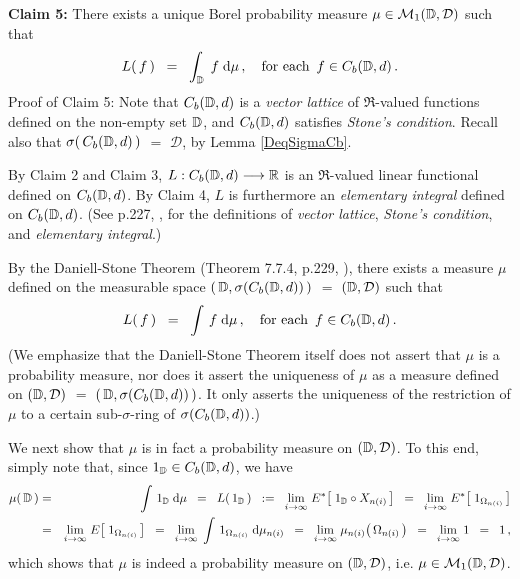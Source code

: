 \vskip 0.8cm
\noindent
\textbf{Claim 5:}\;\;
There exists a unique Borel probability measure $\mu \in \mathcal{M}_{1}(\mathbb{D},\mathcal{D})$ such that
\begin{equation*}
L(\,f\,)
\;\; = \;\;
	\int_{\mathbb{D}}\; f \;\textnormal{d}\mu\,,
\quad
\textnormal{for each \,$f \in C_{b}(\mathbb{D},d)$}\,.
\end{equation*}
\vskip 0.2cm
\noindent
Proof of Claim 5:\;\;
Note that $C_{b}(\mathbb{D},d)$ is a \textit{vector lattice} of $\Re$-valued functions defined on the non-empty set $\mathbb{D}$, and
$C_{b}(\mathbb{D},d)$ satisfies \textit{Stone's condition}.
Recall also that $\sigma\!\left(\,C_{b}(\mathbb{D},d)\,\right)$ $=$ $\mathcal{D}$, by Lemma \ref{DeqSigmaCb}.

\vskip 0.3cm
\noindent
By Claim 2 and Claim 3, $L : C_{b}(\mathbb{D},d) \longrightarrow \mathbb{R}$ is an $\Re$-valued linear functional
defined on $C_{b}(\mathbb{D},d)$.
By Claim 4, $L$ is furthermore an \textit{elementary integral} defined on $C_{b}(\mathbb{D},d)$.
(See p.227, \cite{Cohn2013}, for the definitions of \textit{vector lattice}, \textit{Stone's condition}, and \textit{elementary integral}.)

\vskip 0.3cm
\noindent
By the Daniell-Stone Theorem (Theorem 7.7.4, p.229, \cite{Cohn2013}),
there exists a measure $\mu$ defined on the measurable space
$(\,\mathbb{D},\sigma\!\left(C_{b}(\mathbb{D},d)\right)\,)$ $=$ $(\mathbb{D},\mathcal{D})$ such that
\begin{equation*}
L(\,f\,)
\;\; = \;\;
	\int\, f \;\textnormal{d}\mu\,,
\quad
\textnormal{for each \,$f \in C_{b}(\mathbb{D},d)$}\,.
\end{equation*}
(We emphasize that the Daniell-Stone Theorem itself does not assert that $\mu$ is a probability measure, 
nor does it assert the uniqueness of $\mu$ as a measure defined on
$(\mathbb{D},\mathcal{D})$ $=$ $(\,\mathbb{D},\sigma\!\left(C_{b}(\mathbb{D},d)\right)\,)$.
It only asserts the uniqueness of the restriction of $\mu$ to a certain sub-$\sigma$-ring of
$\sigma\!\left(C_{b}(\mathbb{D},d)\right)$.)

\vskip 0.3cm
\noindent
We next show that $\mu$ is in fact a probability measure on $(\mathbb{D},\mathcal{D})$.
To this end, simply note that, since $1_{\mathbb{D}} \in C_{b}(\mathbb{D},d)$, we have
\begin{eqnarray*}
\mu\!\left(\,\mathbb{D}\,\right)
& = &
	\int\, 1_{\mathbb{D}}\;\textnormal{d}\mu
\;\; = \;\;
	L\!\left(\, 1_{\mathbb{D}} \,\right)
\;\; := \;\;
	\underset{i\rightarrow\infty}{\lim}\; E^{*}\!\left[\; 1_{\mathbb{D}} \circ X_{n(i)} \,\right]
\;\; = \;\;
	\underset{i\rightarrow\infty}{\lim}\; E^{*}\!\left[\; 1_{\Omega_{n(i)}} \,\right]
\\
& = &
	\underset{i\rightarrow\infty}{\lim}\; E\!\left[\; 1_{\Omega_{n(i)}} \,\right]
\;\; = \;\;
	\underset{i\rightarrow\infty}{\lim}\; \int\, 1_{\Omega_{n(i)}} \;\textnormal{d}\mu_{n(i)}
\;\; = \;\;
	\underset{i\rightarrow\infty}{\lim}\; \mu_{n(i)}\!\left(\,\Omega_{n(i)}\,\right)
\;\; = \;\;
	\underset{i\rightarrow\infty}{\lim}\; 1
\;\; = \;\;
	1\,,
\end{eqnarray*}
which shows that $\mu$ is indeed a probability measure on $(\mathbb{D},\mathcal{D})$,
i.e. $\mu \in \mathcal{M}_{1}(\mathbb{D},\mathcal{D})$.


